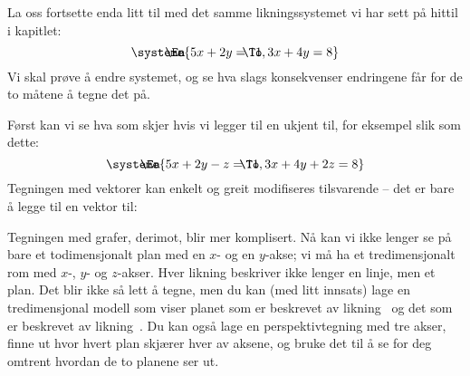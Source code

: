 La oss fortsette enda litt til med det samme likningssystemet vi har
sett på hittil i kapitlet:
\[
\systeme{
\makebox[0pt][l]{\hspace{-2em}\En} 5x + 2y = 11,
\makebox[0pt][l]{\hspace{-2em}\To} 3x + 4y = 8
}
\]
Vi skal prøve å endre systemet, og se hva slags konsekvenser
endringene får for de to måtene å tegne det på.

Først kan vi se hva som skjer hvis vi legger til en ukjent til, for
eksempel slik som dette:
\[
\systeme{
\makebox[0pt][l]{\hspace{-2em}\En} 5x + 2y -  z = 11,
\makebox[0pt][l]{\hspace{-2em}\To} 3x + 4y + 2z = 8
}
\]
Tegningen med vektorer kan enkelt og greit modifiseres tilsvarende --
det er bare å legge til en vektor til:
\begin{center}
\end{center}
Tegningen med grafer, derimot, blir mer komplisert.  Nå kan vi ikke
lenger se på bare et todimensjonalt plan med en $x$- og en $y$-akse;
vi må ha et tredimensjonalt rom med $x$-, $y$- og $z$-akser.  Hver
likning beskriver ikke lenger en linje, men et plan.  Det blir ikke så
lett å tegne, men du kan (med litt innsats) lage en tredimensjonal
modell som viser planet som er beskrevet av likning~\En{} og det som
er beskrevet av likning~\To.  Du kan også lage en perspektivtegning
med tre akser, finne ut hvor hvert plan skjærer hver av aksene, og
bruke det til å se for deg omtrent hvordan de to planene ser ut.

